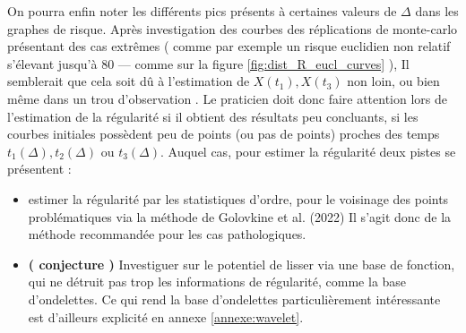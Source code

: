 \bigskip

On pourra enfin noter les différents pics présents à certaines valeurs de $\Delta$ dans les graphes de risque. Après investigation des courbes des réplications de monte-carlo présentant des cas extrêmes ( comme par exemple un risque euclidien non relatif s'élevant jusqu'à 80 — comme sur la figure \ref{fig:dist_R_eucl_curves} ), Il semblerait que cela soit dû à l'estimation de $X(t_1), X(t_3)$ non loin, ou bien même dans un \og trou d'observation \fg. Le praticien doit donc faire attention lors de l'estimation de la régularité si il obtient des résultats peu concluants, si les courbes initiales possèdent peu de points (ou pas de points) proches des temps $t_1(\Delta), t_2(\Delta)$ ou $t_3(\Delta)$. Auquel cas, pour estimer la régularité deux pistes se présentent :

\bigskip

\begin{itemize}
\item estimer la régularité par les statistiques d'ordre, pour le voisinage des points problématiques via la méthode de Golovkine et al. (2022) Il s'agit donc de la méthode recommandée pour les cas pathologiques. 

\bigskip

\item \textbf{( \faExclamationTriangle conjecture )} Investiguer sur le potentiel de lisser via une base de fonction, qui ne détruit pas trop les informations de régularité, comme la base d'ondelettes. Ce qui rend la base d'ondelettes particulièrement intéressante est d'ailleurs explicité en annexe \ref{annexe:wavelet}.
\end{itemize}

